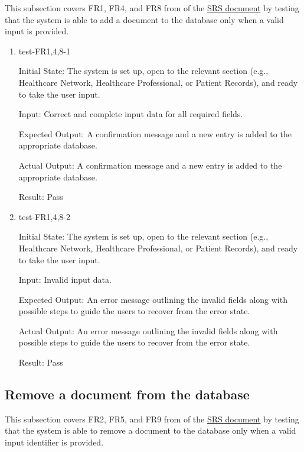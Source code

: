 \documentclass[12pt, titlepage]{article}
\begin{document}
This subsection covers FR1, FR4, and FR8 from of the \href{https://github.com/Inreet-Kaur/capstone/blob/main/docs/SRS/SRS.pdf}{SRS document} by testing that the system is able to add a document to the database only when a valid input is provided.

\begin{enumerate}

  \item{test-FR1,4,8-1} \label{test-FR1,4,8-1}
  
  Initial State: The system is set up, open to the relevant section (e.g., Healthcare Network, Healthcare Professional, or Patient Records), and ready to take the user input.

  Input: Correct and complete input data for all required fields.

  Expected Output: A confirmation message and a new entry is added to the appropriate database.

  Actual Output: A confirmation message and a new entry is added to the appropriate database.

  Result: Pass


  \item{test-FR1,4,8-2} \label{test-FR1,4,8-2}

  Initial State: The system is set up, open to the relevant section (e.g., Healthcare Network, Healthcare Professional, or Patient Records), and ready to take the user input.

  Input: Invalid input data.

  Expected Output: An error message outlining the invalid fields along with possible steps to guide the users to recover from the error state.

  Actual Output: An error message outlining the invalid fields along with possible steps to guide the users to recover from the error state.

  Result: Pass

\end{enumerate}

\subsection{Remove a document from the database} \label{section:3.2}

This subsection covers FR2, FR5, and FR9 from of the \href{https://github.com/Inreet-Kaur/capstone/blob/main/docs/SRS/SRS.pdf}{SRS document} by testing that the system is able to remove a document to the database only when a valid input identifier is provided.
\end{document}
